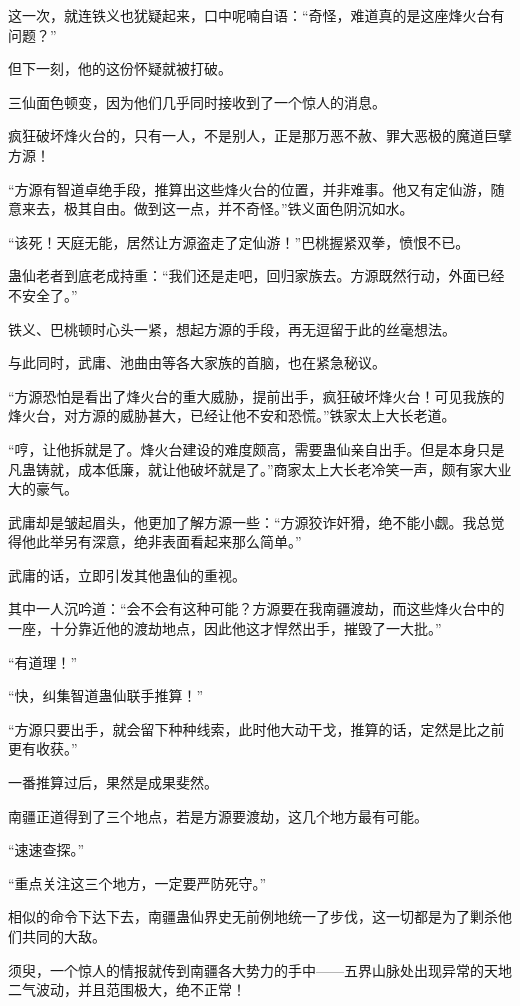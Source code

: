 \begin{this_body}
这一次，就连铁义也犹疑起来，口中呢喃自语：“奇怪，难道真的是这座烽火台有问题？”

但下一刻，他的这份怀疑就被打破。

三仙面色顿变，因为他们几乎同时接收到了一个惊人的消息。

疯狂破坏烽火台的，只有一人，不是别人，正是那万恶不赦、罪大恶极的魔道巨擘方源！

“方源有智道卓绝手段，推算出这些烽火台的位置，并非难事。他又有定仙游，随意来去，极其自由。做到这一点，并不奇怪。”铁义面色阴沉如水。

“该死！天庭无能，居然让方源盗走了定仙游！”巴桃握紧双拳，愤恨不已。

蛊仙老者到底老成持重：“我们还是走吧，回归家族去。方源既然行动，外面已经不安全了。”

铁义、巴桃顿时心头一紧，想起方源的手段，再无逗留于此的丝毫想法。

与此同时，武庸、池曲由等各大家族的首脑，也在紧急秘议。

“方源恐怕是看出了烽火台的重大威胁，提前出手，疯狂破坏烽火台！可见我族的烽火台，对方源的威胁甚大，已经让他不安和恐慌。”铁家太上大长老道。

“哼，让他拆就是了。烽火台建设的难度颇高，需要蛊仙亲自出手。但是本身只是凡蛊铸就，成本低廉，就让他破坏就是了。”商家太上大长老冷笑一声，颇有家大业大的豪气。

武庸却是皱起眉头，他更加了解方源一些：“方源狡诈奸猾，绝不能小觑。我总觉得他此举另有深意，绝非表面看起来那么简单。”

武庸的话，立即引发其他蛊仙的重视。

其中一人沉吟道：“会不会有这种可能？方源要在我南疆渡劫，而这些烽火台中的一座，十分靠近他的渡劫地点，因此他这才悍然出手，摧毁了一大批。”

“有道理！”

“快，纠集智道蛊仙联手推算！”

“方源只要出手，就会留下种种线索，此时他大动干戈，推算的话，定然是比之前更有收获。”

一番推算过后，果然是成果斐然。

南疆正道得到了三个地点，若是方源要渡劫，这几个地方最有可能。

“速速查探。”

“重点关注这三个地方，一定要严防死守。”

相似的命令下达下去，南疆蛊仙界史无前例地统一了步伐，这一切都是为了剿杀他们共同的大敌。

须臾，一个惊人的情报就传到南疆各大势力的手中——五界山脉处出现异常的天地二气波动，并且范围极大，绝不正常！

\end{this_body}

